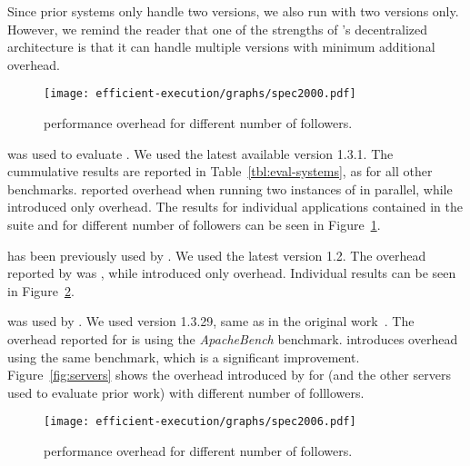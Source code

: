 Since prior systems only handle two versions, we also run \varan with
two versions only.  However, we remind the reader that one of the
strengths of \varan's decentralized architecture is that it can handle
multiple versions with minimum additional overhead.

\begin{figure}[!t]
  \centering
  \texttt{[image: efficient-execution/graphs/spec2000.pdf]}
  \caption{\speczerozero performance overhead for different number of followers.}
  \label{fig:spec2000}
\end{figure}

\boldtext{\speczerozero} %
was used to evaluate \orchestra. We used the latest available version
1.3.1.  The cummulative results are reported in
Table~\ref{tbl:eval-systems}, as for all other benchmarks.  \orchestra
reported \orchestraSpec overhead when running two instances of
\speczerozero in parallel, while \nx introduced only
\speczerozeroOneFollower overhead. The results for individual
applications contained in the \speczerozero suite and for different
number of followers can be seen in Figure~\ref{fig:spec2000}.

\boldtext{\speczerosix} %
has been previously used by \mx. We used the latest version 1.2.  The
overhead reported by \mx was \mxSpec, while \nx introduced only
\speczerosixOneFollower overhead.
Individual results can be seen in Figure~\ref{fig:spec2006}.

\boldtext{\httpd} %
was used by \orchestra.  We used version 1.3.29, same as in the
original work~\cite{orchestra09}.  The overhead reported for
\orchestra is \orchestraHttpd using the \emph{ApacheBench}
benchmark. \nx introduces \httpdAbOneFollower overhead using the same
benchmark, which is a significant improvement.
Figure~\ref{fig:servers} shows the overhead introduced by \varan for
\httpd (and the other servers used to evaluate prior work) with
different number of folllowers. 

\begin{figure}[!t]
 \centering
 \texttt{[image: efficient-execution/graphs/spec2006.pdf]}
 \caption{\speczerosix performance overhead for different number of followers.}
 \label{fig:spec2006}
\end{figure}


